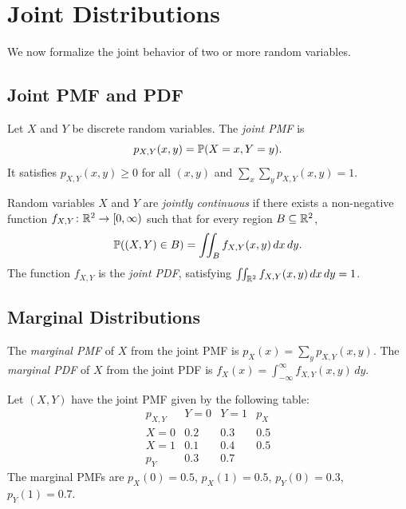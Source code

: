 \documentclass[11pt,a4paper]{article}
\begin{document}

\section{Joint Distributions}
\label{sec:joint}

We now formalize the joint behavior of two or more random variables.

\subsection{Joint PMF and PDF}

\begin{definition}
\label{def:joint_pmf}
Let $X$ and $Y$ be discrete random variables. The \emph{joint PMF} is
\[
    p_{X,Y}(x, y) = \mathbb{P}(X = x, Y = y).
\]
It satisfies $p_{X,Y}(x,y) \geq 0$ for all $(x,y)$ and
$\sum_x \sum_y p_{X,Y}(x,y) = 1$.
\end{definition}

\begin{definition}
\label{def:joint_pdf}
Random variables $X$ and $Y$ are \emph{jointly continuous} if there
exists a non-negative function $f_{X,Y} \colon \mathbb{R}^2 \to [0,\infty)$
such that for every region $B \subseteq \mathbb{R}^2$,
\[
    \mathbb{P}((X, Y) \in B) = \iint_B f_{X,Y}(x, y) \, dx \, dy.
\]
The function $f_{X,Y}$ is the \emph{joint PDF}, satisfying
$\iint_{\mathbb{R}^2} f_{X,Y}(x,y)\,dx\,dy = 1$.
\end{definition}

\subsection{Marginal Distributions}

\begin{definition}
\label{def:marginals}
The \emph{marginal PMF} of $X$ from the joint PMF is
$p_X(x) = \sum_y p_{X,Y}(x, y)$.
The \emph{marginal PDF} of $X$ from the joint PDF is
$f_X(x) = \int_{-\infty}^{\infty} f_{X,Y}(x, y) \, dy$.
\end{definition}

\begin{example}
\label{ex:joint_pmf}
Let $(X, Y)$ have the joint PMF given by the following table:
\[
    \begin{array}{c|cc|c}
    p_{X,Y} & Y = 0 & Y = 1 & p_X \\ \hline
    X = 0 & 0.2 & 0.3 & 0.5 \\
    X = 1 & 0.1 & 0.4 & 0.5 \\ \hline
    p_Y & 0.3 & 0.7 &
    \end{array}
\]
The marginal PMFs are $p_X(0) = 0.5$, $p_X(1) = 0.5$,
$p_Y(0) = 0.3$, $p_Y(1) = 0.7$.
\end{example}
\end{document}
